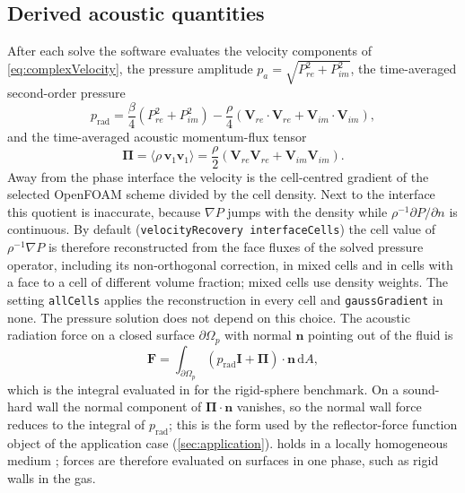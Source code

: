 \documentclass[final,12pt,nopreprintline]{elsarticle}
\newcounter{bla}
\newcommand{\code}[1]{\texttt{#1}}
\begin{document}
\subsection{Derived acoustic quantities}
\label{sec:derivedQuantities}

After each solve the software evaluates the velocity components of
\cref{eq:complexVelocity}, the pressure
amplitude $p_a=\sqrt{P_{re}^2+P_{im}^2}$, the time-averaged second-order
pressure
\begin{equation}
    p_{\mathrm{rad}}
    =
    \frac{\beta}{4}\left(P_{re}^2+P_{im}^2\right)
    -
    \frac{\rho}{4}\left(\mathbf{V}_{re}\cdot\mathbf{V}_{re}
    +\mathbf{V}_{im}\cdot\mathbf{V}_{im}\right),
    \label{eq:radiationPressure}
\end{equation}
and the time-averaged acoustic momentum-flux tensor
\begin{equation}
    \boldsymbol{\Pi}
    =\langle\rho\,\mathbf{v}_1\mathbf{v}_1\rangle
    =\frac{\rho}{2}\left(\mathbf{V}_{re}\mathbf{V}_{re}
    +\mathbf{V}_{im}\mathbf{V}_{im}\right).
    \label{eq:momentumFlux}
\end{equation}
Away from the phase interface the velocity is the cell-centred gradient of the
selected OpenFOAM scheme divided by the cell density.  Next to the interface
this quotient is inaccurate, because $\nabla P$ jumps with the density while
$\rho^{-1}\partial P/\partial n$ is continuous.  By default
(\code{velocityRecovery interfaceCells}) the cell value of $\rho^{-1}\nabla P$
is therefore reconstructed from the face fluxes of the solved pressure
operator, including its non-orthogonal correction, in mixed cells and in
cells with a face to a cell of different volume fraction; mixed cells use
density weights.  The setting \code{allCells} applies the reconstruction in
every cell and \code{gaussGradient} in none.  The pressure solution does not
depend on this choice.
The acoustic radiation force on a closed surface $\partial\Omega_p$ with
normal $\mathbf{n}$ pointing out of the fluid is
\begin{equation}
    \mathbf{F}
    =\int_{\partial\Omega_p}
    \left(p_{\mathrm{rad}}\mathbf{I}+\boldsymbol{\Pi}\right)\cdot\mathbf{n}\,\mathrm{d}A ,
    \label{eq:radiationForce}
\end{equation}
which is the integral evaluated in \cite{Xu2026HelmholtzPML} for the
rigid-sphere benchmark.  On a sound-hard wall the normal component of
$\boldsymbol{\Pi}\cdot\mathbf{n}$ vanishes, so the normal wall force reduces
to the integral of $p_{\mathrm{rad}}$; this is the form used by the
reflector-force function object of the application case
(\cref{sec:application}).   holds in a locally homogeneous medium
\cite{Xu2026HelmholtzPML,bruus2012acoustofluidicsARF}; forces are therefore
evaluated on surfaces in one phase, such as rigid walls in the gas.
\end{document}
